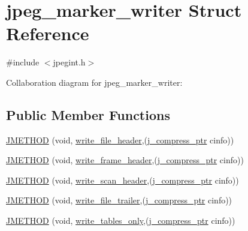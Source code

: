\hypertarget{structjpeg__marker__writer}{}\section{jpeg\+\_\+marker\+\_\+writer Struct Reference}
\label{structjpeg__marker__writer}


{\ttfamily \#include $<$jpegint.\+h$>$}



Collaboration diagram for jpeg\+\_\+marker\+\_\+writer\+:
\subsection*{Public Member Functions}
\begin{DoxyCompactItemize}
\item 
\mbox{\hyperlink{structjpeg__marker__writer_ac5570409054c19f502583dff69fb8fab}{J\+M\+E\+T\+H\+OD}} (void, \mbox{\hyperlink{jcmarker_8c_a0a1af4c95150b6cc958ce4a04580800d}{write\+\_\+file\+\_\+header}},(\mbox{\hyperlink{jpeglib_8h_add2a072c54e3a51550f4975f7ddb91e7}{j\+\_\+compress\+\_\+ptr}} cinfo))
\item 
\mbox{\hyperlink{structjpeg__marker__writer_a16553ec95a48ff5d49a1c698541eb859}{J\+M\+E\+T\+H\+OD}} (void, \mbox{\hyperlink{jcmarker_8c_a3ca174ee750f1f7a7d703f49cece9734}{write\+\_\+frame\+\_\+header}},(\mbox{\hyperlink{jpeglib_8h_add2a072c54e3a51550f4975f7ddb91e7}{j\+\_\+compress\+\_\+ptr}} cinfo))
\item 
\mbox{\hyperlink{structjpeg__marker__writer_a696bbc698ad5760bbeb1614f9e6a7509}{J\+M\+E\+T\+H\+OD}} (void, \mbox{\hyperlink{jcmarker_8c_ade06dd93aedf31146a4833c22b7bd57b}{write\+\_\+scan\+\_\+header}},(\mbox{\hyperlink{jpeglib_8h_add2a072c54e3a51550f4975f7ddb91e7}{j\+\_\+compress\+\_\+ptr}} cinfo))
\item 
\mbox{\hyperlink{structjpeg__marker__writer_affc544100d40a2c75c8e438569ea7844}{J\+M\+E\+T\+H\+OD}} (void, \mbox{\hyperlink{jcmarker_8c_ab695fb3ccfb33e10a7d80689cd08d166}{write\+\_\+file\+\_\+trailer}},(\mbox{\hyperlink{jpeglib_8h_add2a072c54e3a51550f4975f7ddb91e7}{j\+\_\+compress\+\_\+ptr}} cinfo))
\item 
\mbox{\hyperlink{structjpeg__marker__writer_ac0791e1ab4eb10f20144a84a1f0371dc}{J\+M\+E\+T\+H\+OD}} (void, \mbox{\hyperlink{jcmarker_8c_af5564bc6ecf1f982f588f18637c73906}{write\+\_\+tables\+\_\+only}},(\mbox{\hyperlink{jpeglib_8h_add2a072c54e3a51550f4975f7ddb91e7}{j\+\_\+compress\+\_\+ptr}} cinfo))
\item 

\end{DoxyCompactItemize}
